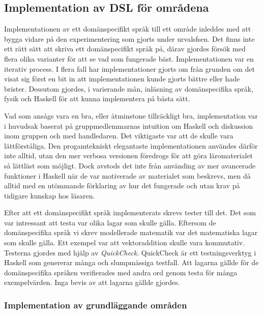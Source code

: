 \begin{draft}

\subsection{Implementation av DSL för områdena}

Implementationen av ett domänspecifikt språk till ett område inleddes med att
bygga vidare på den experimentering som gjorts under urvalsfsen. Det finns inte
ett rätt sätt att skriva ett domänspecifikt språk på, därav gjordes försök med
flera olika varianter för att se vad som fungerade bäst. Implementationen var en
iterativ process. I flera fall har implementationer gjorts om från grunden om
det visat sig först en bit in att implementationen kunde gjorts bättre eller
hade brister. Dessutom gjordes, i varierande mån, inläsning av domänspecifika
språk, fysik och Haskell för att kunna implementera på bästa sätt.

Vad som ansågs vara en bra, eller åtminstone tillräckligt bra, implementation
var i huvudsak baserat på gruppmedlemmarnas intuition om Haskell och diskussion
inom gruppen och med handledaren. Det viktigaste var att de skulle vara
lättförståliga. Den progamtekniskt elegantaste implementationen användes därför
inte alltid, utan den mer verbosa versionen föredrogs för att göra
läromaterialet så lättläst som möjligt. Dock avstods det inte från använding av
mer avancerade funktioner i Haskell när de var motiverade av materialet som
beskrevs, men då alltid med en utömmande förklaring av hur det fungerade och
utan krav på tidigare kunskap hos läsaren.

Efter att ett domänspecifikt språk implementerats skrevs tester till det. Det
som var intressant att testa var olika lagar som skulle gälla. Eftersom de
domänspecifika språk vi skrev modellerade matematik var det matematiska lagar
som skulle gälla. Ett exempel var att vektoraddition skulle vara kommutativ.
Testerna gjordes med hjälp av \textit{QuickCheck}. QuickCheck är ett
testningsverktyg i Haskell som genererar många och slumpmässiga testfall. Att
lagarna gällde för de domänspecifika språken verifierades med andra ord genom
testa för många exempelvärden. Inga bevis av att lagarna gällde gjordes.

\subsubsection*{Implementation av grundläggande områden}
\label{sec:grund_impl}


\end{draft}
